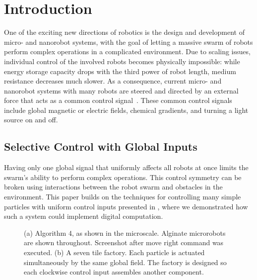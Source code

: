 \section{Introduction}\label{sec:Intro}

One of the exciting new directions of robotics is the design and development
of micro- and nanorobot systems, with the goal of letting a massive swarm of robots
perform complex operations in a complicated environment. Due to scaling 
issues, individual control of the involved robots becomes physically impossible:
while energy storage capacity drops with the third power of robot length,
medium resistance decreases much slower. As a consequence,
current micro- and nanorobot systems with many robots are steered and
directed by an external force that acts as a common control signal~\cite{Donald2013,Chiang2011,Hsi-Wen2012,Diller2013,Jing2013,Ou2013,Lanauze2013}.
These common control signals include global magnetic or electric fields,
chemical gradients, and turning a light source on and off.  

 \subsection{Selective Control with Global Inputs}
Having only one global signal that uniformly affects all robots at once
limits the swarm's ability to perform complex operations.
This control symmetry can be broken using interactions between the robot swarm
and obstacles in the environment. 
This paper builds on the techniques for controlling many simple particles with uniform control inputs presented in \cite{Becker2013f,Becker2014,Becker2014a}, where
we demonstrated how such a system could  implement digital computation.


\begin{figure}
\centering
{} 
\newline
{}
\newline
{}
\caption{(a) 
Algorithm 4, as shown in the microscale. Alginate microrobots are shown throughout. Screenshot after move right command was executed. 
 (b) A seven tile factory. Each particle is actuated simultaneously by the same global field. The factory is designed so each clockwise control input assembles another component.}
\label{fig:1ab} 
\end{figure}



